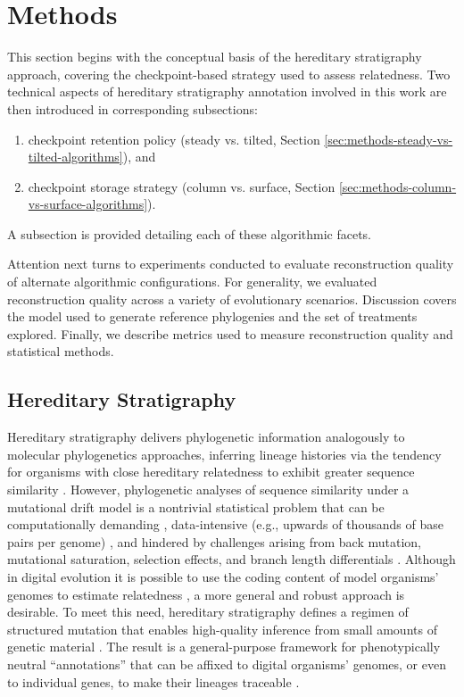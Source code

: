 \section{Methods} \label{sec:methods}

This section begins with the conceptual basis of the hereditary stratigraphy approach, covering the checkpoint-based strategy used to assess relatedness.
Two technical aspects of hereditary stratigraphy annotation involved in this work are then introduced in corresponding subsections:
\begin{enumerate}
\item checkpoint retention policy (steady vs. tilted, Section \ref{sec:methods-steady-vs-tilted-algorithms}), and
\item checkpoint storage strategy (column vs. surface, Section \ref{sec:methods-column-vs-surface-algorithms}).
\end{enumerate}
A subsection is provided detailing each of these algorithmic facets.

Attention next turns to experiments conducted to evaluate reconstruction quality of alternate algorithmic configurations.
For generality, we evaluated reconstruction quality across a variety of evolutionary scenarios.
Discussion covers the model used to generate reference phylogenies and the set of treatments explored.
Finally, we describe metrics used to measure reconstruction quality and statistical methods.

\subsection{Hereditary Stratigraphy}

Hereditary stratigraphy delivers phylogenetic information analogously to molecular phylogenetics approaches, inferring lineage histories via the tendency for organisms with close hereditary relatedness to exhibit greater sequence similarity \citep{yang2012molecular}.
However, phylogenetic analyses of sequence similarity under a mutational drift model is a nontrivial statistical problem \citep{neyman1971molecular} that can be computationally demanding \citep{konno2022deep,stamatakis2013novel}, data-intensive (e.g., upwards of thousands of base pairs per genome) \citep{parks2009increasing,cloutier2019whole,wortley2005much}, and hindered by challenges arising from back mutation, mutational saturation, selection effects, and branch length differentials \citep{brocchieri2001phylogenetic,moreira2000molecular}.
Although in digital evolution it is possible to use the coding content of model organisms' genomes to estimate relatedness \citep{moreno2021case}, a more general and robust approach is desirable.
To meet this need, hereditary stratigraphy defines a regimen of structured mutation that enables high-quality inference from small amounts of genetic material \citep{moreno2022hereditary}.
The result is a general-purpose framework for phenotypically neutral ``annotations'' that can be affixed to digital organisms' genomes, or even to individual genes, to make their lineages traceable \citep{moreno2022hstrat}.

